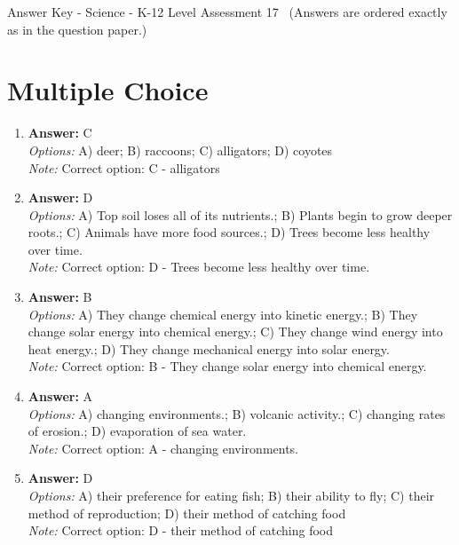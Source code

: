 \documentclass[12pt]{article}
\begin{document}
\begin{center}
Answer Key - Science - K-12 Level Assessment 17 \
\small (Answers are ordered exactly as in the question paper.)
\end{center}

\section*{Multiple Choice}
\begin{enumerate}[label=\arabic*.]
\item \textbf{Answer:} C
\\ \textit{Options:} A) deer; B) raccoons; C) alligators; D) coyotes
\\ \textit{Note:} Correct option: C - alligators
\item \textbf{Answer:} D
\\ \textit{Options:} A) Top soil loses all of its nutrients.; B) Plants begin to grow deeper roots.; C) Animals have more food sources.; D) Trees become less healthy over time.
\\ \textit{Note:} Correct option: D - Trees become less healthy over time.
\item \textbf{Answer:} B
\\ \textit{Options:} A) They change chemical energy into kinetic energy.; B) They change solar energy into chemical energy.; C) They change wind energy into heat energy.; D) They change mechanical energy into solar energy.
\\ \textit{Note:} Correct option: B - They change solar energy into chemical energy.
\item \textbf{Answer:} A
\\ \textit{Options:} A) changing environments.; B) volcanic activity.; C) changing rates of erosion.; D) evaporation of sea water.
\\ \textit{Note:} Correct option: A - changing environments.
\item \textbf{Answer:} D
\\ \textit{Options:} A) their preference for eating fish; B) their ability to fly; C) their method of reproduction; D) their method of catching food
\\ \textit{Note:} Correct option: D - their method of catching food
\end{enumerate}
\end{document}
